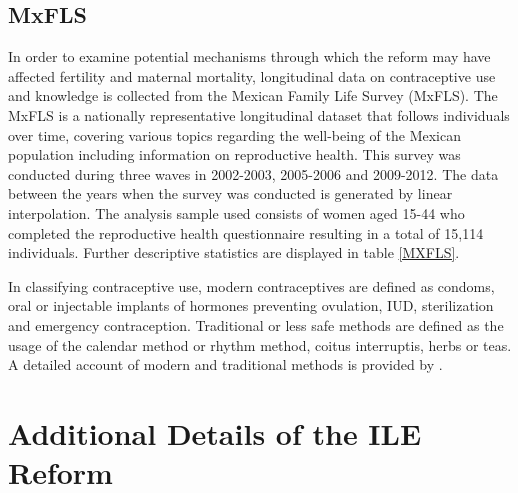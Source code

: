 \documentclass[a4paper, 11pt]{article}
\begin{document}
\begin{spacing}{1.4}
\subsection{MxFLS}\label{mxfls} 
In order to examine potential mechanisms through which the reform may have affected
fertility and maternal mortality, longitudinal data on contraceptive use and knowledge
is collected from the Mexican Family Life Survey (MxFLS). The MxFLS is a nationally
representative longitudinal dataset that follows individuals over time, covering various
topics regarding the well-being of the Mexican population including information on
reproductive health. This survey was conducted during three waves in 2002-2003, 2005-2006
and 2009-2012. The data between the years when the survey was conducted is generated by
linear interpolation. The analysis sample used consists of women aged 15-44 who completed the
reproductive health questionnaire resulting in a total of 15,114 individuals.
Further descriptive statistics are displayed in table \ref{MXFLS}.

In classifying contraceptive use, modern contraceptives are defined as condoms, oral
or injectable implants of hormones preventing ovulation, IUD, sterilization and
emergency contraception. Traditional or less safe methods are defined as the usage of
the calendar method or rhythm method, coitus interruptis, herbs or teas. A detailed
account of modern and traditional methods is provided by \citet{WHO2015b}.
 
 
\section{Additional Details of the ILE Reform}

\end{spacing}
\end{document}
